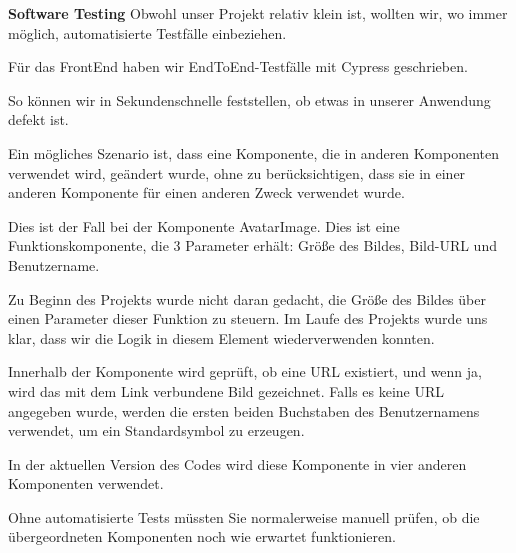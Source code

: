 \textbf{Software Testing }
Obwohl unser Projekt relativ klein ist, wollten wir, wo immer möglich, automatisierte Testfälle einbeziehen.

Für das FrontEnd haben wir EndToEnd-Testfälle mit Cypress geschrieben.

So können wir in Sekundenschnelle feststellen, ob etwas in unserer Anwendung defekt ist.

Ein mögliches Szenario ist, dass eine Komponente, die in anderen Komponenten verwendet wird, geändert wurde, ohne zu berücksichtigen, dass sie in einer anderen Komponente für einen anderen Zweck verwendet wurde.

Dies ist der Fall bei der Komponente AvatarImage.
Dies ist eine Funktionskomponente, die 3 Parameter erhält: Größe des Bildes, Bild-URL und Benutzername.

Zu Beginn des Projekts wurde nicht daran gedacht, die Größe des Bildes über einen Parameter dieser Funktion zu steuern. Im Laufe des Projekts wurde uns klar, dass wir die Logik in diesem Element wiederverwenden konnten.

Innerhalb der Komponente wird geprüft, ob eine URL existiert, und wenn ja, wird das mit dem Link verbundene Bild gezeichnet. Falls es keine URL  angegeben wurde, werden die ersten beiden Buchstaben des Benutzernamens verwendet, um ein Standardsymbol zu erzeugen.

In der aktuellen Version des Codes wird diese Komponente in vier anderen Komponenten verwendet.

Ohne automatisierte Tests müssten Sie normalerweise manuell prüfen, ob die übergeordneten Komponenten noch wie erwartet funktionieren.


